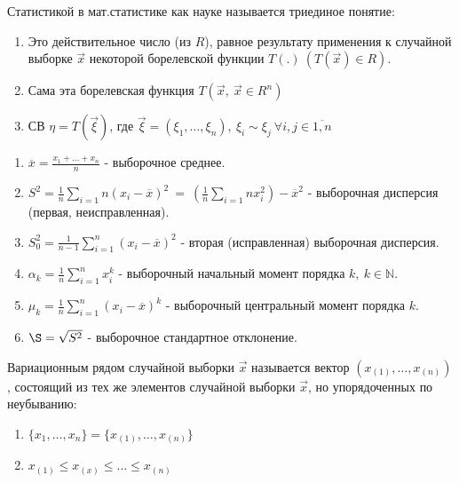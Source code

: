 \begin{defs}[Статистика]
  Статистикой в мат.статистике как науке называется триединое понятие:
  \begin{enumerate}
    \item Это действительное число (из $R$), равное результату применения к случайной выборке
    $\overrightarrow{x}$ некоторой борелевской функции $T(.) \ (T(\overrightarrow{x}) \in R)$.
    \item Сама эта борелевская функция $T(\overrightarrow{x}, \ \overrightarrow{x} \in R^n)$
    \item СВ $\eta=T(\overrightarrow{\xi})$, где $\overrightarrow{\xi}=(\xi_1,\ldots,\xi_n), \ \xi_i \sim \xi_j \ \forall i,j \in \overline{1,n}$
  \end{enumerate}
\end{defs}

\begin{example}
  \begin{enumerate}
    \item $\overline{x} = \frac{x_1+\ldots+x_n}{n}$ - выборочное среднее.
    \item $S^2 = \frac{1}{n}\sum\limits_{i=1}{n}(x_i-\overline{x})^2 \
    = \ (\frac{1}{n}\sum\limits_{i=1}{n}x_i^2) - \overline{x}^2$  - выборочная дисперсия (первая, неисправленная).
    \item $S_0^2 = \frac{1}{n-1}\sum\limits_{i=1}^n(x_i-\overline{x})^2$ - вторая (исправленная) выборочная дисперсия.
    \item $\alpha_k = \frac{1}{n}\sum\limits_{i=1}^n x_i^k$ - выборочный начальный момент порядка $k, \ k \in \mathbb{N}$.
    \item $\mu_k = \frac{1}{n}\sum\limits_{i=1}^n (x_i - \overline{x})^k$ - выборочный центральный момент порядка $k$.
    \item $\S = \sqrt{S^2}$ - выборочное стандартное отклонение.
  \end{enumerate}
\end{example}

\begin{defs}
  Вариационным рядом случайной выборки $\overrightarrow{x}$ называется вектор $(x_{(1)},\ldots,x_{(n)})$,
  состоящий из тех же элементов случайной выборки $\overrightarrow{x}$, но упорядоченных по неубыванию:
  \begin{enumerate}
    \item $\{x_1,\ldots,x_n\} = \{x_{(1)},\ldots,x_{(n)}\}$
    \item $x_{(1)} \leqslant x_{(x)} \leqslant \ldots \leqslant x_{(n)}$
  \end{enumerate}
\end{defs}

